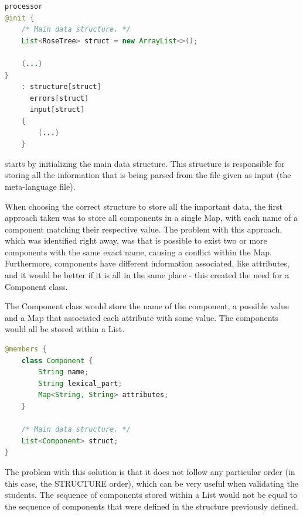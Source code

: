 \begin{center}
\begin{minipage}{11cm}
\begin{lstlisting}[language=java, basicstyle=\small, label={lst:processor}, caption=Processor rule from the meta-grammar]
processor
@init {
    /* Main data structure. */
    List<RoseTree> struct = new ArrayList<>();

    (...)
}
    : structure[struct]
      errors[struct]
      input[struct]
    {
        (...)
    }
\end{lstlisting}
\end{minipage}
\end{center}

\noindent starts by initializing the main data structure. This structure is responsible for storing all the information that is being parsed from the file given as input (the meta-language file). 

When choosing the correct structure to store all the important data, the first \/\*approach\*\/ taken was to store all components in a single Map, with each name of a component
matching their respective value. The problem with this approach, which was identified right away, was that is possible to exist two or more components with the same exact
name, causing a conflict within the Map. Furthermore, components have different information associated, like attributes, and it would be better if it is all in the same
place - this created the need for a Component class.

The Component class would store the name of the component, a possible value and a Map that associated each attribute with some value. The components would all be stored
within a List.
\newpage

\begin{center}
\begin{minipage}{10cm}
\begin{lstlisting}[language=java, basicstyle=\small, label={lst:component_class}, caption=Component class]
@members {
    class Component {
        String name;
        String lexical_part;
        Map<String, String> attributes;
    }

    /* Main data structure. */
    List<Component> struct;
}
\end{lstlisting}
\end{minipage}
\end{center}

The problem with this solution is that it does not follow any particular order (in this case, the STRUCTURE order), which can be very useful when validating the students.
The sequence of components stored within a List would not be equal to the sequence of components that were defined in the structure previously defined.

